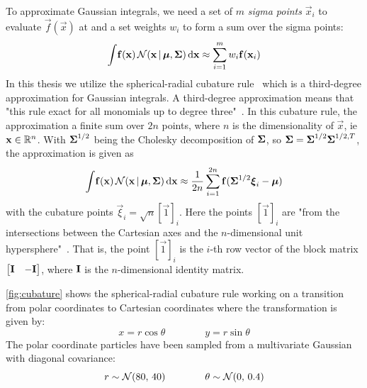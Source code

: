 	To approximate Gaussian integrals, we need a set of \(m\) \emph{sigma points} \( \vec{x}_i \) to evaluate \( \vec{f}(\vec{x}) \) at and a set weights \( w_i \) to form a sum over the sigma points:
	\begin{equation*}
		\int\! \boldsymbol{\mathrm{f}}(\boldsymbol{\mathrm{x}}) \, \mathcal{N}(\boldsymbol{\mathrm{x}} \,\vert\, \boldsymbol{\mathrm{\mu}}, \boldsymbol{\mathrm{\Sigma}}) \dd{\boldsymbol{\mathrm{x}}} \approx \sum_{i = 1}^{m} w_i \boldsymbol{\mathrm{f}}(\boldsymbol{\mathrm{x}}_i)
	\end{equation*}
	In this thesis we utilize the spherical-radial cubature rule~\cite{solinCubatureIntegrationMethods2010} which is a third-degree approximation for Gaussian integrals. A third-degree approximation means that "this rule exact for all monomials up to degree three"~\cite[p. 18]{solinCubatureIntegrationMethods2010}. In this cubature rule, the approximation a finite sum over \( 2n \) points, where \( n \) is the dimensionality of \(\vec{x}\), \ac{ie} \( \boldsymbol{\mathrm{x}} \in \mathbb{R}^n \). With \( \boldsymbol{\mathrm{\Sigma}}^{1/2} \) being the Cholesky decomposition of \( \boldsymbol{\mathrm{\Sigma}} \), so \( \boldsymbol{\mathrm{\Sigma}} = \boldsymbol{\mathrm{\Sigma}}^{1/2} \boldsymbol{\mathrm{\Sigma}}^{1/2, T} \), the approximation is given as
	\begin{equation*}
		\int\! \boldsymbol{\mathrm{f}}(\boldsymbol{\mathrm{x}}) \, \mathcal{N}(\boldsymbol{\mathrm{x}} \,\vert\, \boldsymbol{\mathrm{\mu}}, \boldsymbol{\mathrm{\Sigma}}) \dd{\boldsymbol{\mathrm{x}}} \approx \frac{1}{2n} \sum_{i = 1}^{2n} \boldsymbol{\mathrm{f}}(\boldsymbol{\mathrm{\Sigma}}^{1/2} \boldsymbol{\mathrm{\xi}}_i - \boldsymbol{\mathrm{\mu}})
	\end{equation*}
	with the cubature points \( \vec{\xi}_i = \sqrt{n} [\vec{1}]_i \). Here the points \( [\vec{1}]_i \) are "from the intersections between the Cartesian axes and the \(n\)-dimensional unit hypersphere"~\cite{solinCubatureIntegrationMethods2010}. That is, the point \( [\vec{1}]_i \) is the \(i\)-th row vector of the block matrix \( \begin{bmatrix} \boldsymbol{\mathrm{I}} & -\boldsymbol{\mathrm{I}} \end{bmatrix} \), where \( \boldsymbol{\mathrm{I}} \) is the \(n\)-dimensional identity matrix.

	\autoref{fig:cubature} shows the spherical-radial cubature rule working on a transition from polar coordinates to Cartesian coordinates where the transformation is given by:
	\begin{equation*}
		x = r \cos\theta \qquad\qquad y = r \sin\theta
	\end{equation*}
	The polar coordinate particles have been sampled from a multivariate Gaussian with diagonal covariance:
	\begin{equation*}
		r \sim \mathcal{N}(80,\, 40) \qquad\qquad \theta \sim \mathcal{N}(0,\, 0.4)
	\end{equation*}

